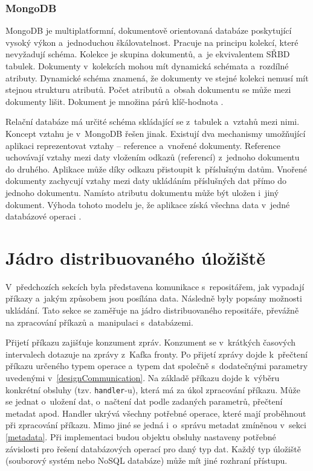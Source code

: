 \subsubsection{MongoDB}
MongoDB je multiplatformní, dokumentově orientovaná databáze poskytující vysoký výkon a~jednoduchou škálovatelnost. Pracuje na principu kolekcí, které nevyžadují schéma. Kolekce je skupina dokumentů, a~je ekvivalentem SŘBD tabulek. Dokumenty v~kolekcích mohou mít dynamická schémata a~rozdílné atributy. Dynamické schéma znamená, že dokumenty ve stejné kolekci nemusí mít stejnou strukturu atributů. Počet atributů a~obsah dokumentu se může mezi dokumenty lišit. Dokument je množina párů klíč-hodnota \cite{mongoDBTutorialsPoint}.

Relační databáze má určité schéma skládající se z~tabulek a~vztahů mezi nimi. Koncept vztahu je v~MongoDB  řešen jinak. Existují dva mechanismy umožňující aplikaci reprezentovat vztahy -- reference a~vnořené dokumenty. Reference uchovávají vztahy mezi daty vložením odkazů (referencí) z~jednoho dokumentu do druhého. Aplikace může díky odkazu přistoupit k~příslušným datům. Vnořené dokumenty zachycují vztahy mezi daty ukládáním příslušných dat přímo do jednoho dokumentu. Namísto atributu dokumentu může být uložen i~jiný dokument. Výhoda tohoto modelu je, že aplikace získá všechna data v~jedné databázové operaci \cite{mongoDBDataModelingIntro}.

\section{Jádro distribuovaného úložiště}
V~předchozích sekcích byla představena komunikace s~repositářem, jak vypadají příkazy a~jakým způsobem jsou posílána data. Následně byly popsány možnosti ukládání. Tato sekce se zaměřuje na jádro distribuovaného repositáře, převážně na zpracování příkazů a~manipulaci s~databázemi.

Přijetí příkazu zajišťuje konzument zpráv. Konzument se v~krátkých časových intervalech dotazuje na zprávy z~Kafka fronty. Po přijetí zprávy dojde k~přečtení příkazu určeného typem operace a~typem dat společně s~dodatečnými parametry uvedenými v~\ref{designCommunication}. Na základě příkazu dojde k~výběru konkrétní obsluhy (tzv. \texttt{handler}-u), která má za úkol zpracování příkazu. Může se jednat o~uložení dat, o~načtení dat podle zadaných parametrů, přečtení metadat apod. Handler ukrývá všechny potřebné operace, které mají proběhnout při zpracování příkazu. Mimo jiné se jedná i~o~správu metadat zmíněnou v~sekci \ref{metadata}. Při implementaci budou objektu obsluhy nastaveny potřebné závislosti pro řešení databázových operací pro daný typ dat. Každý typ úložiště (souborový systém nebo NoSQL databáze) může mít jiné rozhraní přístupu.

